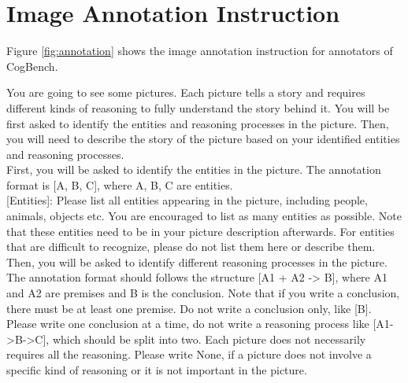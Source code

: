 \section{Image Annotation Instruction}
\label{sec:annotation_instruction}
Figure \ref{fig:annotation} shows the image annotation instruction for annotators of CogBench.

\begin{figure*}
    \begin{tcolorbox}[
      colframe = blue!30!white, 
      colback = blue!2!white,
      colbacktitle = blue!10!white,
      colupper = black, collower = yellow!75!red,
      coltitle = black!90!white
      ]
      \small
      You are going to see some pictures. Each picture tells a story and requires different kinds of reasoning to fully understand the story behind it. You will be first asked to identify the entities and reasoning processes in the picture. Then, you will need to describe the story of the picture based on your identified entities and reasoning processes. \\
  
      First, you will be asked to identify the entities in the picture. The annotation format is [A, B, C], where A, B, C are entities. \\
  
      [Entities]: Please list all entities appearing in the picture, including people, animals, objects etc. You are encouraged to list as many entities as possible. Note that these entities need to be in your picture description afterwards. For entities that are difficult to recognize, please do not list them here or describe them. \\
  
      Then, you will be asked to identify different reasoning processes in the picture. The annotation format should follows the structure [A1 + A2 -> B], where A1 and A2 are premises and B is the conclusion. Note that if you write a conclusion, there must be at least one premise. Do not write a conclusion only, like [B]. Please write one conclusion at a time, do not write a reasoning process like [A1->B->C], which should be split into two. Each picture does not necessarily requires all the reasoning. Please write None, if a picture does not involve a specific kind of reasoning or it is not important in the picture. \\
  

\end{tcolorbox}
\end{figure*}
